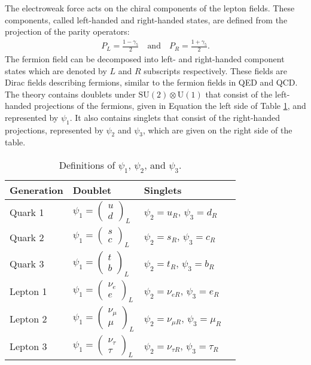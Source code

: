 The electroweak force acts on the chiral components of the lepton fields.
These components, called left-handed and right-handed states, are defined from the projection of the parity operators:
\begin{equation}\begin{split}\label{eqn:chiralOps}
P_L=\frac{1-\gamma_5}{2} \quad\text{and}\quad
P_R=\frac{1+\gamma_5}{2}.
\end{split}\end{equation}
The fermion field can be decomposed into left- and right-handed component states which are denoted by $L$ and $R$ subscripts respectively.
These fields are Dirac fields describing fermions, similar to the fermion fields in QED and QCD.
The theory contains doublets under $\text{SU}(2)\otimes\text{U}(1)$ that consist of the left-handed projections of the fermions, given in Equation the left side of Table \ref{tab:su2Doublets}, and represented by $\psi_1$.
It also contains singlets that consist of the right-handed projections, represented by $\psi_2$ and $\psi_3$, which are given on the right side of the table.
\begin{table}[h!]
\begin{center}
\begin{tabular}{l l l l}
\toprule
Generation & Doublet & Singlets \\
\midrule
Quark 1 & $\psi_1=\begin{pmatrix}u\\d\end{pmatrix}_L$             & $\psi_2=u_R$, $\psi_3=d_R$ \\
Quark 2 & $\psi_1=\begin{pmatrix}s\\c\end{pmatrix}_L$             & $\psi_2=s_R$, $\psi_3=c_R$ \\
Quark 3 & $\psi_1=\begin{pmatrix}t\\b\end{pmatrix}_L$             & $\psi_2=t_R$, $\psi_3=b_R$ \\
Lepton 1 & $\psi_1=\begin{pmatrix}\nu_e\\e\end{pmatrix}_L$        & $\psi_2=\nu_{eR}$, $\psi_3=e_R$ \\
Lepton 2 & $\psi_1=\begin{pmatrix}\nu_\mu\\\mu\end{pmatrix}_L$    & $\psi_2=\nu_{\mu R}$, $\psi_3=\mu_R$ \\
Lepton 3 & $\psi_1=\begin{pmatrix}\nu_\tau\\\tau\end{pmatrix}_L$  & $\psi_2=\nu_{\tau R}$, $\psi_3=\tau_R$ \\
\bottomrule
\end{tabular}
\caption{Definitions of $\psi_1$, $\psi_2$, and $\psi_3$.}
\label{tab:su2Doublets}
\end{center}
\end{table}
